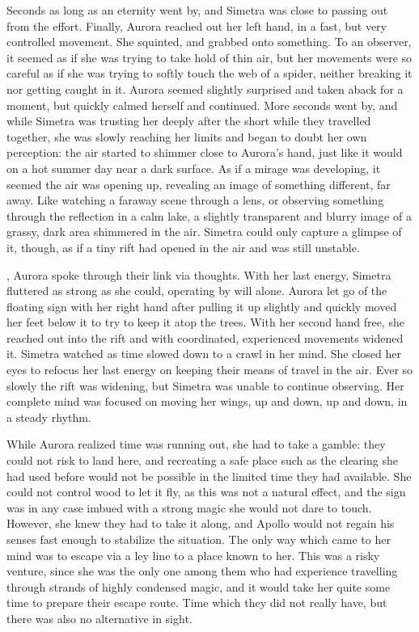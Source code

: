 Seconds as long as an eternity went by, and Simetra was close to passing out from the effort. Finally, Aurora reached out her left hand, in a fast, but very controlled movement. She squinted, and grabbed onto something. To an observer, it seemed as if she was trying to take hold of thin air, but her movements were so careful as if she was trying to softly touch the web of a spider, neither breaking it nor getting caught in it. Aurora seemed slightly surprised and taken aback for a moment, but quickly calmed herself and continued. More seconds went by, and while Simetra was trusting her deeply after the short while they travelled together, she was slowly reaching her limits and began to doubt her own perception: the air started to shimmer close to Aurora's hand, just like it would on a hot summer day near a dark surface. As if a mirage was developing, it seemed the air was opening up, revealing an image of something different, far away. Like watching a faraway scene through a lens, or observing something through the reflection in a calm lake, a slightly transparent and blurry image of a grassy, dark area shimmered in the air. Simetra could only capture a glimpse of it, though, as if a tiny rift had opened in the air and was still unstable.

, Aurora spoke through their link via thoughts. With her last energy, Simetra fluttered as strong as she could, operating by will alone. Aurora let go of the floating sign with her right hand after pulling it up slightly and quickly moved her feet below it to try to keep it atop the trees. With her second hand free, she reached out into the rift and with coordinated, experienced movements widened it. Simetra watched as time slowed down to a crawl in her mind. She closed her eyes to refocus her last energy on keeping their means of travel in the air. Ever so slowly the rift was widening, but Simetra was unable to continue observing. Her complete mind was focused on moving her wings, up and down, up and down, in a steady rhythm.

\fancybreaker{}

While Aurora realized time was running out, she had to take a gamble: they could not risk to land here, and recreating a safe place such as the clearing she had used before would not be possible in the limited time they had available. She could not control wood to let it fly, as this was not a natural effect, and the sign was in any case imbued with a strong magic she would not dare to touch. However, she knew they had to take it along, and Apollo would not regain his senses fast enough to stabilize the situation. The only way which came to her mind was to escape via a ley line to a place known to her. This was a risky venture, since she was the only one among them who had experience travelling through strands of highly condensed magic, and it would take her quite some time to prepare their escape route. Time which they did not really have, but there was also no alternative in sight.

